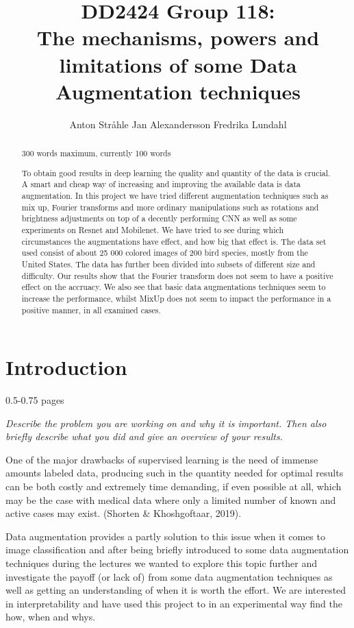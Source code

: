 \documentclass{article}
\title{DD2424 Group 118: \\ The mechanisms, powers and limitations of some Data Augmentation techniques}
\author{%
  Anton Stråhle \And Jan Alexandersson \And Fredrika Lundahl}
\begin{document}
	
\maketitle

\begin{abstract}

300 words maximum, currently 100 words

To obtain good results in deep learning the quality and quantity of the data is crucial. A smart and cheap way of increasing and improving the available data is data augmentation. In this project we have tried different augmentation techniques such as mix up, Fourier transforms and more ordinary manipulations such as rotations and brightness adjustments on top of a decently performing CNN as well as some experiments on Resnet and Mobilenet. We have tried to see during which circumstances the augmentations have effect, and how big that effect is. The data set used consist of about 25 000 colored images of 200 bird species, mostly from the United States. The data has further been divided into subsets of different size and difficulty. Our results show that the Fourier transform does not seem to have a positive effect on the accruacy. We also see that basic data augmentations techniques seem to increase the performance, whilst MixUp does not seem to impact the performance in a positive manner, in all examined cases.


\end{abstract}

\section{Introduction}

0.5-0.75 pages

\textit{Describe the problem you are working on and why it is important. Then also briefly describe what you did and give an overview of your results.}

One of the major drawbacks of supervised learning is the need of immense amounts labeled data, producing such in the quantity needed for optimal results can be both costly and extremely time demanding, if even possible at all, which may be the case with medical data where only a limited number of known and active cases may exist.  (Shorten \& Khoshgoftaar, 2019). 

Data augmentation provides a partly solution to this issue when it comes to image classification and after being briefly introduced to some data augmentation techniques during the lectures we wanted to explore this topic further and investigate the payoff (or lack of) from some data augmentation techniques as well as getting an understanding of when it is worth the effort. We are interested in interpretability and have used this project to in an experimental way find the how, when and whys. 
\end{document}
